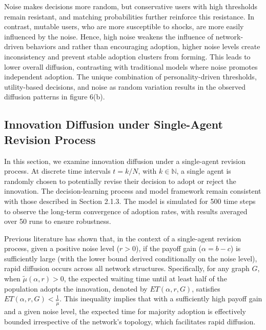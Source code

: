 \documentclass{article} %
\begin{document}
Noise makes decisions more random, but conservative users with high thresholds remain resistant, and matching probabilities further reinforce this resistance. In contrast, mutable users, who are more susceptible to shocks, are more easily influenced by the noise. Hence, high noise weakens the influence of network-driven behaviors and rather than encouraging adoption, higher noise levels create inconsistency and prevent stable adoption clusters from forming. This leads to lower overall diffusion, contrasting with traditional models where noise promotes independent adoption. The unique combination of personality-driven thresholds, utility-based decisions, and noise as random variation results in the observed diffusion patterns in figure 6(b). 
\subsection{Innovation Diffusion under Single-Agent Revision Process}

In this section, we examine innovation diffusion under a single-agent revision process. At discrete time intervals \( t = k/N \), with \( k \in \mathbb{N} \), a single agent is randomly chosen to potentially revise their decision to adopt or reject the innovation. The decision-learning process and model framework remain consistent with those described in Section 2.1.3. The model is simulated for 500 time steps to observe the long-term convergence of adoption rates, with results averaged over 50 runs to ensure robustness.

Previous literature \cite{kreindler2014rapid} has shown that, in the context of a single-agent revision process, given a positive noise level (\( r > 0 \)), if the payoff gain (\( \alpha = b - c \)) is sufficiently large (with the lower bound derived conditionally on the noise level), rapid diffusion occurs across all network structures. Specifically, for any graph \( G \), when \( \tilde{\mu}(\alpha, r) > 0 \), the expected waiting time until at least half of the population adopts the innovation, denoted by \( ET(\alpha, r, G) \), satisfies \( ET(\alpha, r, G) < \frac{1}{\tilde{\mu}} \). This inequality implies that with a sufficiently high payoff gain and a given noise level, the expected time for majority adoption is effectively bounded irrespective of the network's topology, which facilitates rapid diffusion.
\end{document}
